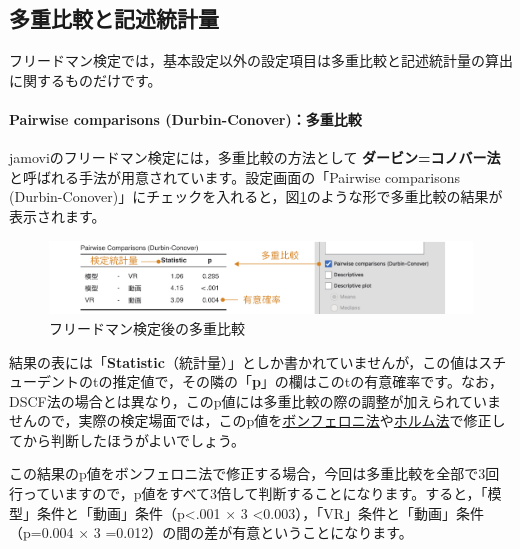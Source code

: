 \documentclass[
  12pt,
  a5jpaper,
  lualatex, ja=standard]{bxjsbook}
\renewcommand{\emph}[1]{\textbf{\color{emph} #1}}
\begin{document}
\hypertarget{sub:ANOVA-friedman-pairwise}{%
\subsection{多重比較と記述統計量}\label{sub:ANOVA-friedman-pairwise}}

フリードマン検定では，基本設定以外の設定項目は多重比較と記述統計量の算出に関するものだけです。

\hypertarget{pairwise-comparisons-durbin-conoverux591aux91cdux6bd4ux8f03}{%
\paragraph*{Pairwise comparisons (Durbin-Conover)：多重比較}\label{pairwise-comparisons-durbin-conoverux591aux91cdux6bd4ux8f03}}

jamoviのフリードマン検定には，多重比較の方法として\emph{ダービン=コノバー法}と呼ばれる手法が用意されています。設定画面の「Pairwise comparisons (Durbin-Conover)」にチェックを入れると，図\ref{fig:ANOVA-friedman-pairwise}のような形で多重比較の結果が表示されます。

\begin{figure}[!ht]

{\centering \includegraphics[width=1\linewidth]{images/ANOVA/friedman-pairwise} 

}

\caption{フリードマン検定後の多重比較}\label{fig:ANOVA-friedman-pairwise}
\end{figure}

結果の表には「\textbf{Statistic}（統計量）」としか書かれていませんが，この値はスチューデントのtの推定値で，その隣の「\textbf{p}」の欄はこのtの有意確率です。なお，DSCF法の場合とは異なり，このp値には多重比較の際の調整が加えられていませんので，実際の検定場面では，このp値を\protect\hyperlink{subsub:ANOVA-anova-posthoc-bonferroni}{ボンフェロニ法}や\protect\hyperlink{subsub:ANOVA-anova-posthoc-holm}{ホルム法}で修正してから判断したほうがよいでしょう。

この結果のp値をボンフェロニ法で修正する場合，今回は多重比較を全部で3回行っていますので，p値をすべて3倍して判断することになります。すると，「模型」条件と「動画」条件（p\textless.001 × 3 \textless0.003），「VR」条件と「動画」条件（p=0.004 × 3 =0.012）の間の差が有意ということになります。
\end{document}

